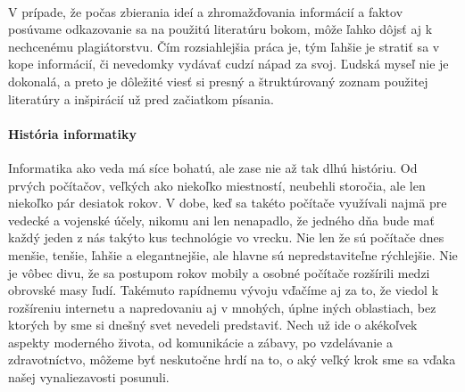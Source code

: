 \documentclass[10pt,twoside,slovak,a4paper]{article}
\begin{document}
\paragraph{} V prípade, že počas zbierania ideí a zhromažďovania informácií a faktov posúvame odkazovanie sa na použitú literatúru bokom, môže ľahko dôjsť aj k nechcenému plagiátorstvu. Čím rozsiahlejšia práca je, tým ľahšie je stratiť sa v kope informácií, či nevedomky vydávať cudzí nápad za svoj. Ľudská myseľ nie je dokonalá, a preto je dôležité viesť si presný a štruktúrovaný zoznam použitej literatúry a inšpirácií už pred začiatkom písania.

\paragraph{História informatiky} Informatika ako veda má síce bohatú, ale zase nie až tak dlhú históriu. Od prvých počítačov, veľkých ako niekoľko miestností, neubehli storočia, ale len niekoľko pár desiatok rokov. V dobe, keď sa takéto počítače využívali najmä pre vedecké a vojenské účely, nikomu ani len nenapadlo, že jedného dňa bude mať každý jeden z nás takýto kus technológie vo vrecku. Nie len že sú počítače dnes menšie, tenšie, ľahšie a elegantnejšie, ale hlavne sú nepredstaviteľne rýchlejšie. Nie je vôbec divu, že sa postupom rokov mobily a osobné počítače rozšírili medzi obrovské masy ľudí. Takémuto rapídnemu vývoju vďačíme aj za to, že viedol k rozšíreniu internetu a napredovaniu aj v mnohých, úplne iných oblastiach, bez ktorých by sme si dnešný svet nevedeli predstaviť. Nech už ide o akékoľvek aspekty moderného života, od komunikácie a zábavy, po vzdelávanie a zdravotníctvo, môžeme byť neskutočne hrdí na to, o aký veľký krok sme sa vďaka našej vynaliezavosti posunuli.





\end{document}
